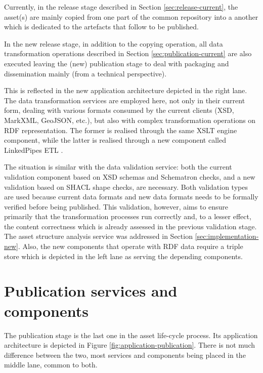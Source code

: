     \enlargethispage{3em}
    
	Currently, in the release stage described in Section \ref{sec:release-current}, the asset(s) are mainly copied from one part of the common repository into a another which is dedicated to the artefacts that follow to be published. 
	
	
	
	In the new release stage, in addition to the copying operation, all data transformation operations described in Section \ref{sec:publication-current} are also executed leaving the (new) publication stage to deal with packaging and dissemination mainly (from a technical perspective).
	
	This is reflected in the new application architecture depicted in the right lane. The data transformation services are employed here, not only in their current form, dealing with various formats consumed by the current clients (XSD, MarkXML, GeoJSON, etc.), but also with complex transformation operations on RDF representation. The former is realised through the same XSLT engine component, while the latter is realised through a new component called LinkedPipes ETL \citep{linkedpipes-klimek2016linkedpipes,linkedpipes-klimek2017linkedpipes}.
	
	The situation is similar with the data validation service: both the current validation component based on XSD schemas and Schematron checks, and a new validation based on SHACL shape checks, are necessary. Both validation types are used because current data formats and new data formats needs to be formally verified before being published. This validation, however, aims to ensure primarily that the transformation processes run correctly and, to a lesser effect, the content correctness which is already assessed in the previous validation stage. The asset structure analysis service was addressed in Section \ref{sec:implementation-new}. Also, the new components that operate with RDF data require a triple store which is depicted in the left lane as serving the depending components.
	
	
	\section{Publication services and components}
	\label{sec:publication-application}	
	
	The publication stage is the last one in the asset life-cycle process. Its application architecture is depicted in Figure \ref{fig:application-publication}. There is not much difference between the two, most services and components being placed in the middle lane, common to both. 
	
